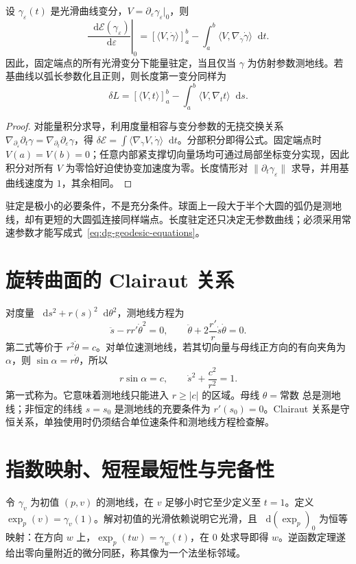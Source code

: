 \documentclass[UTF8,12pt,a4paper,fontset=fandol]{ctexbook}
\newcommand{\dd}{\mathop{}\!\mathrm d}
\newcommand{\ip}[2]{\langle #1,#2\rangle}
\newcommand{\norm}[1]{\lVert #1\rVert}
\begin{document}
\begin{theorem}[第一变分公式]
设 $\gamma_\varepsilon(t)$ 是光滑曲线变分，$V=\partial_\varepsilon\gamma_\varepsilon|_0$，则
\begin{equation}
 \left.\frac{\dd\mathcal E(\gamma_\varepsilon)}{\dd\varepsilon}\right|_0
 =\left[\ip V{\dot\gamma}\right]_a^b
 -\int_a^b\ip V{\nabla_{\dot\gamma}\dot\gamma}\dd t.
 \label{eq:dg-energy-variation}
\end{equation}
因此，固定端点的所有光滑变分下能量驻定，当且仅当 $\gamma$ 为仿射参数测地线。若基曲线以弧长参数化且正则，则长度第一变分同样为
\begin{equation}
 \delta L=\left[\ip Vt\right]_a^b-\int_a^b\ip V{\nabla_t t}\dd s.
 \label{eq:dg-length-variation}
\end{equation}
\end{theorem}
\begin{proof}
对能量积分求导，利用度量相容与变分参数的无挠交换关系 $\nabla_{\partial_\varepsilon}\partial_t\gamma=\nabla_{\partial_t}\partial_\varepsilon\gamma$，得 $\delta\mathcal E=\int\ip{\nabla_{\dot\gamma}V}{\dot\gamma}\dd t$。分部积分即得公式。固定端点时 $V(a)=V(b)=0$；任意内部紧支撑切向量场均可通过局部坐标变分实现，因此积分对所有 $V$ 为零恰好迫使协变加速度为零。长度情形对 $\norm{\partial_t\gamma_\varepsilon}$ 求导，并用基曲线速度为 $1$，其余相同。
\end{proof}
驻定是极小的必要条件，不是充分条件。球面上一段大于半个大圆的弧仍是测地线，却有更短的大圆弧连接同样端点。长度驻定还只决定无参数曲线；必须采用常速参数才能写成式~\eqref{eq:dg-geodesic-equations}。

\section{旋转曲面的 Clairaut 关系}
对度量 $\dd s^2+r(s)^2\dd\theta^2$，测地线方程为
\[
 \ddot s-rr'\dot\theta^2=0,\qquad
 \ddot\theta+2\frac{r'}r\dot s\dot\theta=0.
\]
第二式等价于 $r^2\dot\theta=c$。对单位速测地线，若其切向量与母线正方向的有向夹角为 $\alpha$，则 $\sin\alpha=r\dot\theta$，所以
\begin{equation}
 r\sin\alpha=c,\qquad
 \dot s^2+\frac{c^2}{r^2}=1.
 \label{eq:dg-clairaut}
\end{equation}
第一式称为。它意味着测地线只能进入 $r\ge|c|$ 的区域。母线 $\theta=\text{常数}$ 总是测地线；非恒定的纬线 $s=s_0$ 是测地线的充要条件为 $r'(s_0)=0$。Clairaut 关系是守恒关系，单独使用时仍须结合单位速条件和测地线方程检查解。

\section{指数映射、短程最短性与完备性}
令 $\gamma_v$ 为初值 $(p,v)$ 的测地线，在 $v$ 足够小时它至少定义至 $t=1$。定义 $\exp_p(v)=\gamma_v(1)$。解对初值的光滑依赖说明它光滑，且 $\dd(\exp_p)_0$ 为恒等映射：在方向 $w$ 上，$\exp_p(tw)=\gamma_w(t)$，在 $0$ 处求导即得 $w$。逆函数定理遂给出零向量附近的微分同胚，称其像为一个法坐标邻域。
\end{document}
